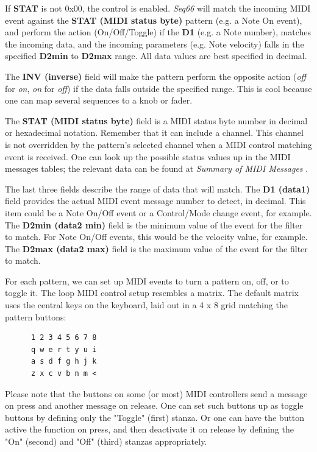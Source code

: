    If \textbf{STAT} is not 0x00, the control is enabled.  \textsl{Seq66} will
   match the incoming MIDI event against the \textbf{STAT (MIDI status byte)}
   pattern (e.g. a Note On event), and perform the action (On/Off/Toggle) if
   the \textbf{D1} (e.g. a Note number), matches the incoming data, and the
   incoming parameters (e.g. Note velocity) falls in the specified
   \textbf{D2min} to \textbf{D2max} range.  All data values are best specified
   in decimal.

   The \textbf{INV (inverse)} field will make the pattern perform the opposite
   action (\textsl{off} for \textsl{on}, \textsl{on} for \textsl{off}) if the
   data falls outside the specified range.  This is cool because one can map
   several sequences to a knob or fader.

   The \textbf{STAT (MIDI status byte)} field is a MIDI status byte number in
   decimal or hexadecimal notation.
   Remember that it can include a channel.  This channel is not overridden by
   the pattern's selected channel when a MIDI control matching event is
   received. 
   One can look up the possible status values up in the MIDI messages tables;
   the relevant data can be found at
   \textsl{Summary of MIDI Messages} \cite{midicontroltable}.

   The last three fields describe the range of data that will match.  The
   \textbf{D1 (data1)} field provides the actual MIDI event message number to
   detect, in decimal.  This item could be a Note On/Off event or a
   Control/Mode change event, for example.
   The \textbf{D2min (data2 min)} field is the minimum value of the event for
   the filter to match. For Note On/Off events, this would be the velocity
   value, for example.
   The \textbf{D2max (data2 max)} field is the maximum value of the event for
   the filter to match.


   For each pattern, we can set up MIDI events to turn a 
   pattern on, off, or to toggle it.
   The loop MIDI control setup resembles a matrix.  The default matrix
   uses the central keys on the keyboard, laid out in a 4 x 8 grid matching the
   pattern buttons:

   \begin{verbatim}
      1 2 3 4 5 6 7 8
      q w e r t y u i
      a s d f g h j k
      z x c v b n m <
   \end{verbatim}

   Please note that the buttons on some (or most) MIDI controllers send a
   message on press and another message on release.  One can set such buttons
   up as toggle buttons by defining only the "Toggle" (first) stanza.
   Or one can have the button active the function on press, and then deactivate
   it on release by defining the "On" (second) and "Off" (third) stanzas
   appropriately.

